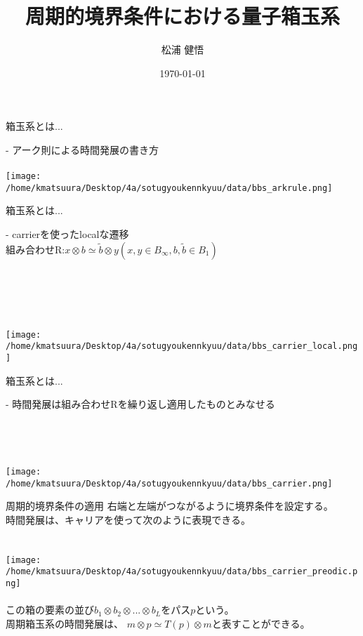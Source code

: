 \documentclass[aspectratio=169, dvipdfmx, 11pt]{beamer} %
\title[Quantinization of Preodic Box Ball System]{周期的境界条件における量子箱玉系}
\author[k.matsuura]{松浦 健悟}
\institute[]{東京大学教養学部統合自然科学科物質基礎科学コース}
\date{\today}
\begin{document}
\maketitle


\begin{frame}{箱玉系とは...}

- アーク則による時間発展の書き方
\\~\\
\texttt{[image: /home/kmatsuura/Desktop/4a/sotugyoukennkyuu/data/bbs\_arkrule.png]}
\end{frame}

\begin{frame}{箱玉系とは...}

- carrierを使ったlocalな遷移\\
組み合わせR:$x \otimes b  \simeq \tilde{b} \otimes y(x,y \in B_\infty, b,\tilde{b} \in B_1)$
\\~\\
\\~\\
\\~\\
\texttt{[image: /home/kmatsuura/Desktop/4a/sotugyoukennkyuu/data/bbs\_carrier\_local.png]}
\end{frame}

\begin{frame}{箱玉系とは...}

- 時間発展は組み合わせRを繰り返し適用したものとみなせる\\
\\~\\
\\~\\
\texttt{[image: /home/kmatsuura/Desktop/4a/sotugyoukennkyuu/data/bbs\_carrier.png]}
\end{frame}

\begin{frame}{周期的境界条件の適用}
右端と左端がつながるように境界条件を設定する。\\
時間発展は、キャリアを使って次のように表現できる。\\
\\~\\
\texttt{[image: /home/kmatsuura/Desktop/4a/sotugyoukennkyuu/data/bbs\_carrier\_preodic.png]}
\\~\\
この箱の要素の並び$b_1 \otimes b_2 \otimes ... \otimes b_L$をパス$p$という。\\
周期箱玉系の時間発展は、 $m \otimes p \simeq T(p) \otimes m $と表すことができる。\\

\end{frame}
\end{document}
